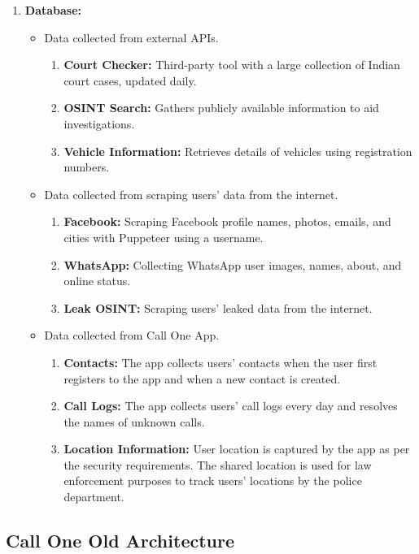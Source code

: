 \begin{enumerate}[label=\roman*.]
    \item \textbf{Database:}
    \begin{itemize}
        \item Data collected from external APIs.
        \begin{enumerate}[label=\arabic*.]
            \item \textbf{Court Checker:} Third-party tool with a large collection of Indian court cases, updated daily.
            \item \textbf{OSINT Search:} Gathers publicly available information to aid investigations.
            \item \textbf{Vehicle Information:} Retrieves details of vehicles using registration numbers.
        \end{enumerate}
        \item Data collected from scraping users' data from the internet.
        \begin{enumerate}[label=\arabic*.]
            \item \textbf{Facebook:} Scraping Facebook profile names, photos, emails, and cities with Puppeteer using a username.
            \item \textbf{WhatsApp:} Collecting WhatsApp user images, names, about, and online status.
            \item \textbf{Leak OSINT:} Scraping users' leaked data from the internet.
        \end{enumerate}
        \item Data collected from Call One App.
        \begin{enumerate}[label=\arabic*.]
            \item \textbf{Contacts:} The app collects users' contacts when the user first registers to the app and when a new contact is created.
            \item \textbf{Call Logs:} The app collects users' call logs every day and resolves the names of unknown calls.
            \item \textbf{Location Information:} User location is captured by the app as per the security requirements. The shared location is used for law enforcement purposes to track users' locations by the police department.
        \end{enumerate}
    \end{itemize}
\end{enumerate}

\subsection{Call One Old Architecture}\label{subsec:old-architecture}

